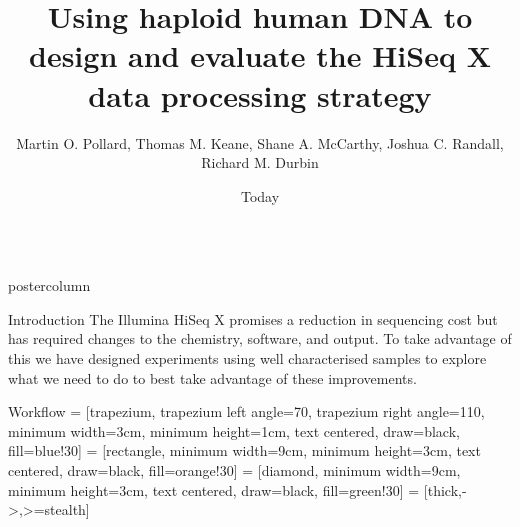 \documentclass[final]{beamer}
\title{Using haploid human DNA to design and evaluate the HiSeq X data processing strategy}
\author{Martin O. Pollard, Thomas M. Keane, Shane A. McCarthy, Joshua C. Randall, Richard M. Durbin}
\institute[Wellcome Trust Sanger Institute]{Wellcome Trust Sanger Institute}
\date{Today}
\begin{document}
\begin{frame}{}
    \begin{columns}
    \begin{column}{.49\textwidth}
        \begin{beamercolorbox}[center,wd=\textwidth]{postercolumn}
            \begin{minipage}[T]{.95\textwidth}  %
            \begin{block}{Introduction}
            The Illumina HiSeq X promises a reduction in sequencing cost but has required changes to the chemistry, software, and output.  To take advantage of this we have designed experiments using well characterised samples to explore what we need to do to best take advantage of these improvements. 
            \end{block}
            \begin{block}{Workflow}
                 = [trapezium, trapezium left angle=70, trapezium right angle=110, minimum width=3cm, minimum height=1cm, text centered, draw=black, fill=blue!30]
                 = [rectangle, minimum width=9cm, minimum height=3cm, text centered, draw=black, fill=orange!30]
                 = [diamond, minimum width=9cm, minimum height=3cm, text centered, draw=black, fill=green!30]
                 = [thick,->,>=stealth]
                \centering
\end{block}
\end{minipage}
\end{beamercolorbox}
\end{column}
\end{columns}
\end{frame}
\end{document}
